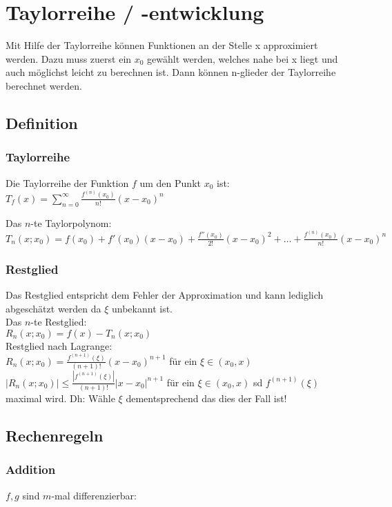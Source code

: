 \section{Taylorreihe / -entwicklung}
Mit Hilfe der Taylorreihe können Funktionen an der Stelle x approximiert werden. Dazu muss zuerst ein $x_0$ gewählt werden, welches nahe bei x liegt und auch möglichst leicht zu berechnen ist. Dann können n-glieder der Taylorreihe berechnet werden.

\subsection{Definition}
\subsubsection{Taylorreihe}
Die Taylorreihe der Funktion $f$ um den Punkt $x_0$ ist:\newline
$T_f (x) = \sum_{n = 0}^\infty \frac{f^{(n)}(x_0)}{n!}(x - x_0)^n$\newline

Das $n$-te Taylorpolynom:\newline
{\footnotesize
$T_n (x; x_0) = f(x_0) + f'(x_0)(x-x_0) + \frac{f''(x_0)}{2!}(x-x_0)^2 + \ldots + \frac{f^{(n)}(x_0)}{n!}(x-x_0)^n$
}

\subsubsection{Restglied}
{\small
Das Restglied entspricht dem Fehler der Approximation und kann lediglich abgeschätzt werden da $\xi$ unbekannt ist.\\
Das $n$-te Restglied: \\
$R_n (x; x_0) = f(x) - T_n (x; x_0)$\\

Restglied nach Lagrange: \\
$R_n (x; x_0) = \frac{f^{(n+1)}(\xi)}{(n+1)!} (x-x_0)^{n+1}$ für ein $\xi \in (x_0, x)$ \\
$|R_n (x; x_0)| \leq \frac{|f^{(n+1)}(\xi)|}{(n+1)!} |x-x_0|^{n+1}$ für ein $\xi \in (x_0, x)$ sd $f^{(n+1)}(\xi)$ maximal wird. Dh: Wähle $\xi$ dementsprechend das dies der Fall ist!
}

\subsection{Rechenregeln}
\subsubsection{Addition}
$f, g$ sind $m$-mal differenzierbar:

